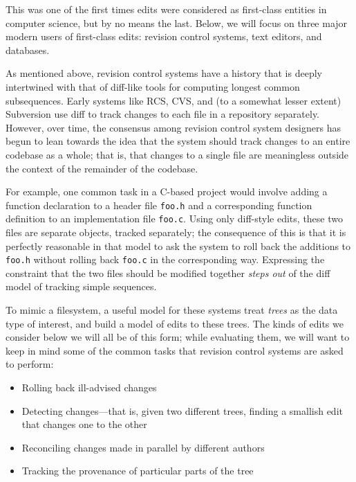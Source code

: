 \documentclass{article}
\newif\ifhighlightnew\highlightnewfalse
\newenvironment{newcontent}{\ifhighlightnew\color{green!55!black}[new]\fi}{\ifhighlightnew\color{black}\fi}
\begin{document}
This was one of the first times edits were considered as first-class
entities in computer science, but by no means the last.
\begin{newcontent}%
Below, we will focus on three major modern users of first-class edits:
revision control systems, text editors, and databases.

As mentioned above, revision control systems have a history that is deeply
intertwined with that of diff-like tools for computing longest common
subsequences. Early systems like RCS, CVS, and (to a somewhat lesser extent)
Subversion use diff to track changes to each file in a repository
separately. However, over time, the consensus among revision control system
designers has begun to lean towards the idea that the system should track
changes to an entire codebase as a whole; that is, that changes to a single
file are meaningless outside the context of the remainder of the codebase.

For example, one common task in a C-based project would involve adding a
function declaration to a header file \texttt{foo.h} and a corresponding
function definition to an implementation file \texttt{foo.c}. Using only
diff-style edits, these two files are separate objects, tracked separately;
the consequence of this is that it is perfectly reasonable in that model to
ask the system to roll back the additions to \texttt{foo.h} without rolling
back \texttt{foo.c} in the corresponding way. Expressing the constraint that
the two files should be modified together \emph{steps out} of the diff model
of tracking simple sequences.

To mimic a filesystem, a useful model for these systems treat \emph{trees}
as the data type of interest, and build a model of edits to these trees. The
kinds of edits we consider below we will all be of this form; while
evaluating them, we will want to keep in mind some of the common tasks that
revision control systems are asked to perform:
\begin{itemize}
    \item Rolling back ill-advised changes
    \item Detecting changes---that is, given two different trees, finding a
        smallish edit that changes one to the other
    \item Reconciling changes made in parallel by different authors
    \item Tracking the provenance of particular parts of the tree
\end{itemize}


\end{newcontent}
\end{document}
